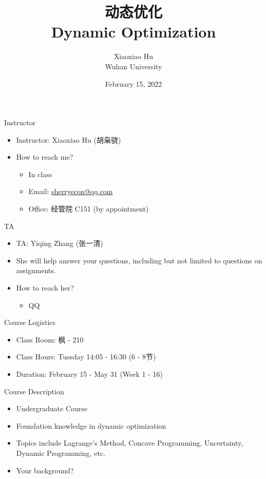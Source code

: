 \documentclass{beamer}
\title[Optimization]{\large 动态优化 \\ Dynamic Optimization}
\author[Xiaoxiao Hu]{Xiaoxiao Hu \\ \smallskip \footnotesize Wuhan University}
\date[Feb. 15, 2022]{February 15, 2022}
\begin{document}
\begin{frame}
 \titlepage
\end{frame}
 



\begin{frame}{Instructor}
\begin{itemize}
	\item Instructor: Xiaoxiao Hu (胡枭骁)
	\item How to reach me?
	\begin{itemize}
		\item In class
		\item Email: \href{mailto:sherryecon@qq.com}{sherryecon@qq.com} 
		\item Office: 经管院 C151 (by appointment)
	\end{itemize}
\end{itemize}
\end{frame}

\begin{frame}{TA}
	\begin{itemize}
		\item TA: Yiqing Zhang (张一清)
		\item She will help answer your questions, including but not limited to questions on assignments.
		\item How to reach her?
	\begin{itemize}
		\item QQ
	\end{itemize}
	\end{itemize}
\end{frame}

\begin{frame}{Course Logistics}
	\begin{itemize}
		\item Class Room: 枫 - 210
		\item Class Hours: Tuesday 14:05 - 16:30 (6 - 8节)
		\item Duration: February 15 - May 31 (Week 1 - 16)		
	\end{itemize}
\end{frame}

\begin{frame}{Course Description}
\begin{itemize}
	\item Undergraduate Course
	\item Foundation knowledge in dynamic optimization 
	\item Topics include Lagrange's Method, Concave Programming, Uncertainty, Dynamic Programming, etc.
	\item Your background?
\end{itemize}
\end{frame}
\end{document}
